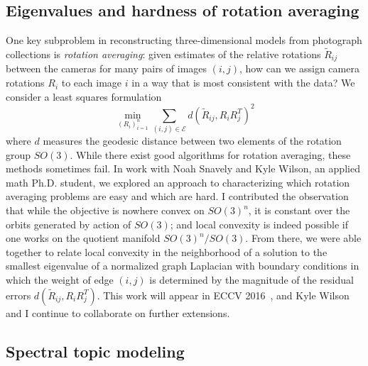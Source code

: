 \documentclass{amsart}
\begin{document}
\subsection*{Eigenvalues and hardness of rotation averaging}

One key subproblem in reconstructing three-dimensional models from
photograph collections is {\em rotation averaging}: given estimates of
the relative rotations $\tilde{R}_{ij}$ between the cameras for many
pairs of images $(i,j)$, how can we assign camera rotations $R_i$ to
each image $i$ in a way that is most consistent with the data?  We
consider a least squares formulation
\[
  \min_{(R_i)_{i=1}^n} \sum_{(i,j)
  \in \mathcal{E}} d(\tilde{R}_{ij}, R_i R_j^T)^2
\]
where $d$ measures the geodesic distance between two elements of
the rotation group $SO(3)$.  While there exist good algorithms for
rotation averaging, these methods sometimes fail.  In work with
Noah Snavely and Kyle Wilson, an applied math Ph.D. student,
we explored an approach to characterizing which rotation averaging
problems are easy and which are hard.
%
I contributed the observation that while the objective is nowhere convex
on $SO(3)^n$, it is constant over the orbits generated by action of
$SO(3)$; and local convexity is indeed possible if one works on the
quotient manifold $SO(3)^n/SO(3)$. From there, we were able together to
relate local convexity in the neighborhood of a solution to the smallest
eigenvalue of a normalized graph Laplacian with boundary conditions in
which the weight of edge $(i,j)$ is determined by the magnitude of the
residual errors $d(\tilde{R}_{ij}, R_i R_j^T)$.  This work will appear
in ECCV 2016~\cite{2016-rotations}, and Kyle Wilson and I continue to
collaborate on further extensions.


\subsection*{Spectral topic modeling}
\end{document}
